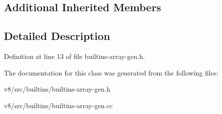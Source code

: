 \subsection*{Additional Inherited Members}


\subsection{Detailed Description}


Definition at line 13 of file builtins-\/array-\/gen.\+h.



The documentation for this class was generated from the following files\+:\begin{DoxyCompactItemize}
\item 
v8/src/builtins/builtins-\/array-\/gen.\+h\item 
v8/src/builtins/builtins-\/array-\/gen.\+cc\end{DoxyCompactItemize}
